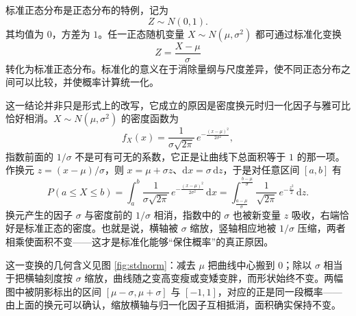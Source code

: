 \documentclass[UTF8]{ctexbook}
\begin{document}
标准正态分布是正态分布的特例，记为
\[
Z\sim N(0,1).
\]
其均值为 $0$，方差为 $1$。任一正态随机变量 $X\sim N(\mu,\sigma^2)$ 都可通过标准化变换
\[
Z=\frac{X-\mu}{\sigma}
\]
转化为标准正态分布。标准化的意义在于消除量纲与尺度差异，使不同正态分布之间可以比较，并使概率计算统一化。

这一结论并非只是形式上的改写，它成立的原因是密度换元时归一化因子与雅可比恰好相消。$X\sim N(\mu,\sigma^2)$ 的密度函数为
\[
f_X(x)=\frac{1}{\sigma\sqrt{2\pi}}\,e^{-\frac{(x-\mu)^2}{2\sigma^2}},
\]
指数前面的 $1/\sigma$ 不是可有可无的系数，它正是让曲线下总面积等于 $1$ 的那一项。作换元 $z=(x-\mu)/\sigma$，则 $x=\mu+\sigma z$、$\mathrm{d}x=\sigma\,\mathrm{d}z$，于是对任意区间 $[a,b]$ 有
\[
P(a\le X\le b)=\int_{a}^{b}\frac{1}{\sigma\sqrt{2\pi}}\,e^{-\frac{(x-\mu)^2}{2\sigma^2}}\,\mathrm{d}x
=\int_{\frac{a-\mu}{\sigma}}^{\frac{b-\mu}{\sigma}}\frac{1}{\sqrt{2\pi}}\,e^{-\frac{z^2}{2}}\,\mathrm{d}z .
\]
换元产生的因子 $\sigma$ 与密度前的 $1/\sigma$ 相消，指数中的 $\sigma$ 也被新变量 $z$ 吸收，右端恰好是标准正态的密度。也就是说，横轴被 $\sigma$ 缩放，竖轴相应地被 $1/\sigma$ 压缩，两者相乘使面积不变——这才是标准化能够“保住概率”的真正原因。

这一变换的几何含义见图 \ref{fig:stdnorm}：减去 $\mu$ 把曲线中心搬到 $0$；除以 $\sigma$ 相当于把横轴刻度按 $\sigma$ 缩放，曲线随之变高变瘦或变矮变胖，而形状始终不变。两幅图中被阴影标出的区间 $[\mu-\sigma,\mu+\sigma]$ 与 $[-1,1]$，对应的正是同一段概率——由上面的换元可以确认，缩放横轴与归一化因子互相抵消，面积确实保持不变。
\end{document}
